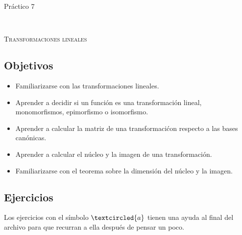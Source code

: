 \documentclass[12pt]{amsart}
\begin{document}



\centerline{\Large{Pr\' actico 7}}

\

\centerline{\textsc{Transformaciones lineales}}

\subsection*{Objetivos}

\begin{itemize}
 \item Familiarizarse con las transformaciones lineales.
 \item Aprender a decidir si un funci\'on es una transformaci\'on lineal, monomorfismos, epimorfismo o isomorfismo.
 \item Aprender a calcular la matriz de una transformaci\'con respecto a las bases can\'onicas.
 \item Aprender a calcular el n\'ucleo y la imagen de una transformaci\'on.

 \item Familiarizarse con el teorema sobre la dimensi\'on del n\'ucleo y la imagen.
\end{itemize}


\bigbreak 


\subsection*{Ejercicios} Los ejercicios con el s\'imbolo $\textcircled{a}$ tienen una ayuda al final del archivo para que recurran a ella despu\'es de pensar un poco.
\end{document}
